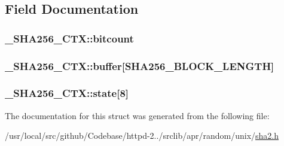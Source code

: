\subsection{Field Documentation}
\subsubsection[{\texorpdfstring{bitcount}{bitcount}}]{ \+\_\+\+S\+H\+A256\+\_\+\+C\+T\+X\+::bitcount}\hypertarget{struct__SHA256__CTX_ad7f82a082163b345b5ac7a0f9478e5a6}{}\label{struct__SHA256__CTX_ad7f82a082163b345b5ac7a0f9478e5a6}
\subsubsection[{\texorpdfstring{buffer}{buffer}}]{ \+\_\+\+S\+H\+A256\+\_\+\+C\+T\+X\+::buffer\mbox{[}{\bf S\+H\+A256\+\_\+\+B\+L\+O\+C\+K\+\_\+\+L\+E\+N\+G\+TH}\mbox{]}}\hypertarget{struct__SHA256__CTX_a64c78dd109eb135023e28c3b17ea0c59}{}\label{struct__SHA256__CTX_a64c78dd109eb135023e28c3b17ea0c59}
\subsubsection[{\texorpdfstring{state}{state}}]{ \+\_\+\+S\+H\+A256\+\_\+\+C\+T\+X\+::state\mbox{[}8\mbox{]}}\hypertarget{struct__SHA256__CTX_a651ee21c1ee494e3a6f755f1586acba7}{}\label{struct__SHA256__CTX_a651ee21c1ee494e3a6f755f1586acba7}


The documentation for this struct was generated from the following file\+:\begin{DoxyCompactItemize}
\item 
/usr/local/src/github/\+Codebase/httpd-\/2../srclib/apr/random/unix/\hyperlink{sha2_8h}{sha2.\+h}\end{DoxyCompactItemize}
